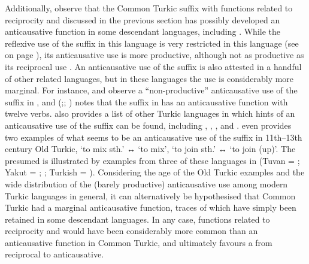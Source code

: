 Additionally, observe that the Common Turkic suffix  with functions related to reciprocity and  discussed in the previous section has possibly developed an anticausative function in some descendant languages, including . While the reflexive use of the suffix  in this language is very restricted in this language (see  on page \pageref{tab:ch7:recp-refl-tuvan}), its anticausative use is more productive, although not as productive as its reciprocal use \citep[1176ff., 1221f.]{kuular:2007}. An anticausative use of the suffix is also attested in a handful of other related languages, but in these languages the use is considerably more marginal. For instance, \citet[295]{nedjalkov:2007d} and \citet[1142]{nedjalkov:nedjalkov:2007} observe a “non-productive” anticausative use of the suffix  in , and \citeauthor{gandon:2013} (\citeyear[16f.]{gandon:2013};; \citeyear{gandon:2018}) notes that the suffix  in  has an anticausative function with twelve verbs. \citet[57ff.]{gandon:2013} also provides a list of other Turkic languages in which hints of an anticausative use of the suffix can be found, including , , , and . \citet[58]{gandon:2013} even provides two examples of what seems to be an anticausative use of the suffix  in 11th--13th century Old Turkic,  ‘to mix sth.’ ↔  ‘to mix’,  ‘to join sth.’ ↔  ‘to join (up)’. The presumed  is illustrated by examples from three of these languages in  (Tuvan = \citealt[1177, 1222]{kuular:2007}; Yakut = \citealt[295]{nedjalkov:2007d}; \citealt[1112]{nedjalkov:nedjalkov:2007}; Turkish = \citealt[12, 17]{gandon:2013}). Considering the age of the Old Turkic examples and the wide distribution of the (barely productive) anticausative use among modern Turkic languages in general, it can alternatively be hypothesised that Common Turkic  had a marginal anticausative function, traces of which have simply been retained in some descendant languages. In any case, functions related to reciprocity and  would have been considerably more common than an anticausative function in Common Turkic, and \citet{gandon:2018} ultimately favours a  from reciprocal to anticausative.


